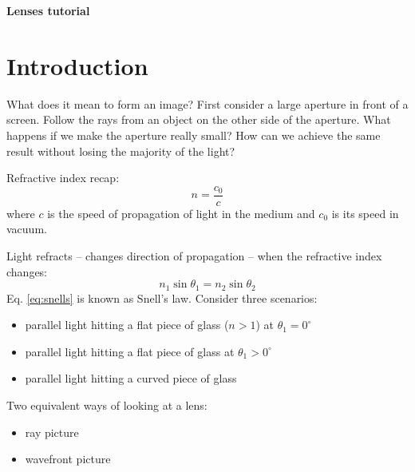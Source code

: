 \documentclass[a4paper]{report}
\begin{document}
\setcounter{secnumdepth}{2}



\addtocounter{exercises}{1}

\begin{center}
\textbf{\Large{Lenses tutorial}}
\end{center}

\section{Introduction}
What does it mean to form an image? First consider a large aperture in front of a screen. Follow the rays from an object on the other side of the aperture. What happens if we make the aperture really small? How can we achieve the same result without losing the majority of the light?

Refractive index recap:
\begin{equation}
n = \frac{c_0}{c}
\end{equation}
where $c$ is the speed of propagation of light in the medium and $c_0$ is its speed in vacuum.

Light refracts -- changes direction of propagation -- when the refractive index changes:
\begin{equation}
\label{eq:snells}
	n_1 \sin{\theta_1} = n_2 \sin{\theta_2}
\end{equation} 
Eq. \ref{eq:snells} is known as Snell's law. Consider three scenarios:
\begin{itemize}
	\item parallel light hitting a flat piece of glass ($n>1$) at $\theta_1=0^\circ$
	\item parallel light hitting a flat piece of glass at $\theta_1>0^\circ$
	\item parallel light hitting a curved piece of glass
\end{itemize}
Two equivalent ways of looking at a lens:
\begin{itemize}
	\item ray picture
	\item wavefront picture
\end{itemize}
\end{document}
